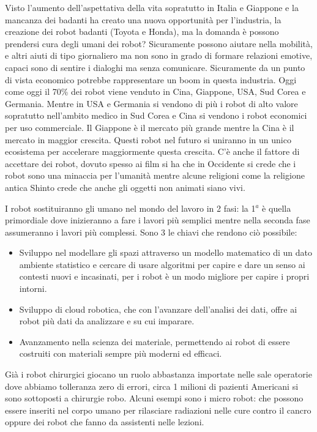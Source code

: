 \documentclass[a4page, 11pt]{article}
\begin{document}
Visto l'aumento dell'aspettativa della vita sopratutto in Italia e
Giappone e la mancanza dei badanti ha creato una nuova opportunità per
l'industria, la creazione dei robot badanti (Toyota e Honda), ma la
domanda è possono prendersi cura degli umani dei robot? Sicuramente
possono aiutare nella mobilità, e altri aiuti di tipo giornaliero ma non
sono in grado di formare relazioni emotive, capaci sono di sentire i
dialoghi ma senza comunicare. Sicuramente da un punto di vista economico
potrebbe rappresentare un boom in questa industria. Oggi come oggi il
70\% dei robot viene venduto in Cina, Giappone, USA, Sud Corea e
Germania. Mentre in USA e Germania si vendono di più i robot di alto
valore sopratutto nell'ambito medico in Sud Corea e Cina si vendono i
robot economici per uso commerciale. Il Giappone è il mercato più grande
mentre la Cina è il mercato in maggior crescita. Questi robot nel futuro
si uniranno in un unico ecosistema per accelerare maggiormente questa
crescita. C'è anche il fattore di accettare dei robot, dovuto spesso ai
film si ha che in Occidente si crede che i robot sono una minaccia per
l'umanità mentre alcune religioni come la religione antica Shinto crede
che anche gli oggetti non animati siano vivi.

I robot sostituiranno gli umano nel mondo del lavoro in 2 fasi: la 1$^a$ è
quella primordiale dove inizieranno a fare i lavori più semplici mentre
nella seconda fase assumeranno i lavori più complessi. Sono 3 le chiavi
che rendono ciò possibile:

\begin{itemize}
	 
	\item
	Sviluppo nel modellare gli spazi attraverso un modello matematico di
	un dato ambiente statistico e cercare di usare algoritmi per capire e
	dare un senso ai contesti nuovi e incasinati, per i robot è un modo
	migliore per capire i propri intorni.
	\item
	Sviluppo di cloud robotica, che con l'avanzare dell'analisi dei dati,
	offre ai robot più dati da analizzare e su cui imparare.
	\item
	Avanzamento nella scienza dei materiale, permettendo ai robot di
	essere costruiti con materiali sempre più moderni ed efficaci.
\end{itemize}

Già i robot chirurgici giocano un ruolo abbastanza importate nelle sale
operatorie dove abbiamo tolleranza zero di errori, circa 1 milioni di
pazienti Americani si sono sottoposti a chirurgie robo. Alcuni esempi
sono i micro robot: che possono essere inseriti nel corpo umano per
rilasciare radiazioni nelle cure contro il cancro oppure dei robot che
fanno da assistenti nelle lezioni.
\end{document}
